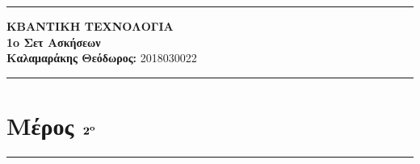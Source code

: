 \documentclass[12pt]{article}
\begin{document}
\greektext

\noindent\rule{\textwidth}{2pt}
\begin{center}
{\bf ΚΒΑΝΤΙΚΗ ΤΕΧΝΟΛΟΓΙΑ}\\ 
{\bf 1o Σετ Ασκήσεων }\\
{\bf Καλαμαράκης Θεόδωρος:} 2018030022\\
\end{center}
\rule{\textwidth}{.5pt}
\noindent

\begin{center}

\end{center}
 
 

\justifying

\section*{{\bf Μέρος  $\bf 2^o$ }}

\rule{\textwidth}{.5pt}
\section*{{}}
\end{document}
